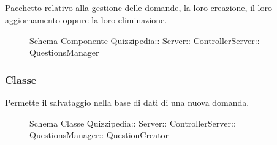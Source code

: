 \subsection{}
Pacchetto relativo alla gestione delle domande, la loro creazione, il loro aggiornamento oppure la loro eliminazione.
\begin{figure}[H]
\centering
\noindent{}
\caption[Schema Componente Quizzipedia::Server::ControllerServer::QuestionsManager]{Schema Componente Quizzipedia:: Server:: ControllerServer:: QuestionsManager}
\end{figure}
\subsubsection{Classe }
Permette il salvataggio nella base di dati di una nuova domanda.
\begin{figure}[H]
\centering
\noindent{}
\caption[Schema Classe QuestionCreator]{Schema Classe Quizzipedia:: Server:: ControllerServer:: QuestionsManager:: QuestionCreator}
\end{figure}
